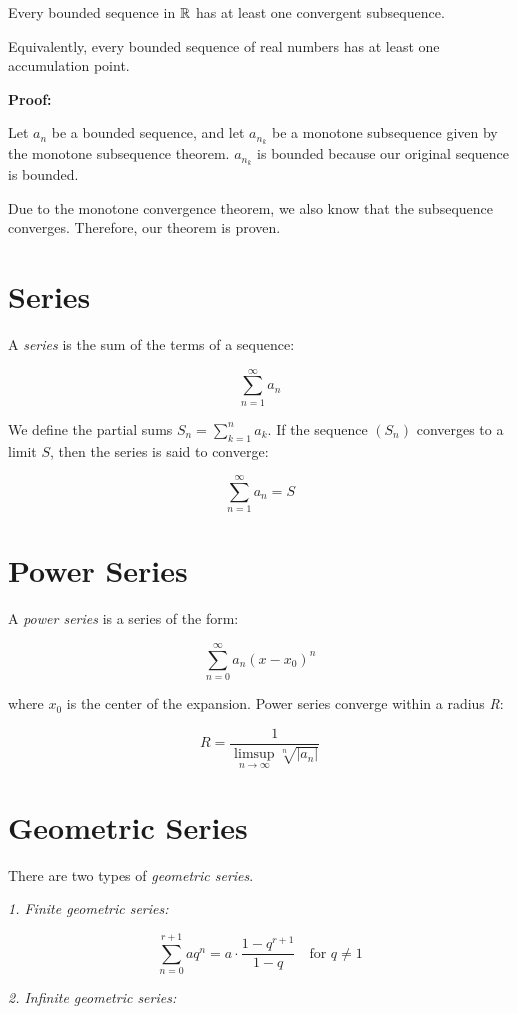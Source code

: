 Every bounded sequence in \(\mathbb{R}\) has at least one convergent subsequence.

Equivalently, every bounded sequence of real numbers has at least one accumulation point.

\textbf{Proof:}

Let \(a_n\) be a bounded sequence, and let \(a_{n_k}\) be a monotone subsequence given by the monotone subsequence
theorem. \(a_{n_k}\) is bounded because our original sequence is bounded.

Due to the monotone convergence theorem, we also know that the subsequence converges.
Therefore, our theorem is proven.

\QED

\section{Series}

A \emph{series} is the sum of the terms of a sequence:

\[
	\sum_{n=1}^{\infty} a_n
\]

We define the partial sums \(S_n = \sum_{k=1}^n a_k\). If the sequence \((S_n)\) converges to a limit \(S\), then the series is said to converge:

\[
	\sum_{n=1}^{\infty} a_n = S
\]

\section{Power Series}

A \emph{power series} is a series of the form:

\[
	\sum_{n=0}^{\infty} a_n {(x - x_0)}^n
\]

where \(x_0\) is the center of the expansion. Power series converge within a radius \emph{R}:

\[
	R = \frac{1}{\limsup\limits_{n \to \infty} \sqrt[n]{|a_n|}}
\]

\section{Geometric Series}

There are two types of \emph{geometric series}.

\emph{1. Finite geometric series:}

\[
	\sum_{n = 0}^{r + 1} aq^n = a \cdot \frac{1 - q^{r + 1}}{1 - q} \quad \text{for } q \ne 1
\]

\emph{2. Infinite geometric series:}

